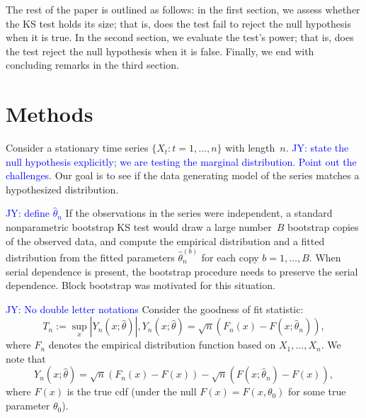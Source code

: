 \documentclass[12pt, letterpaper]{article}
\newcommand{\jy}[1]{\textcolor{blue}{JY: #1}}
\begin{document}
The rest of the paper is outlined as follows: in the first 
section, we assess whether the KS
test holds its size; that is, does the test fail to reject the null hypothesis
when it is true. In the second section, we evaluate the 
test's power; that is, does the test reject the null hypothesis when it is 
false.
Finally, we end with 
concluding remarks in the third section.

\section{Methods}
\label{sec:methods}

Consider a stationary time series $\{X_t: t = 1, \ldots, n\}$ with length~$n$.
\jy{state the null hypothesis explicitly; we are testing the marginal
  distribution. Point out the challenges.}
Our goal is to see if the data generating model of the series matches a 
hypothesized distribution.


\jy{define $\hat\theta_n$}
If the observations in the series were independent, a 
standard
nonparametric bootstrap KS test would draw a large number~$B$ bootstrap copies 
of the observed data, and compute the empirical distribution and a
fitted distribution from the fitted parameters
$\hat\theta_n^{(b)}$ for each copy $b = 1, \ldots, B$. When serial 
dependence is present, the bootstrap procedure 
needs to preserve the serial dependence. Block bootstrap was motivated for this 
situation.


\jy{No double letter notations}
Consider the goodness of fit statistic:
\begin{equation*}
  T_n := \sup_x|Y_n(x; \hat\theta)|, 
Y_n(x; \hat\theta) = \sqrt{n}(F_n(x) - F(x; \hat\theta_n)),
\end{equation*}
where $F_n$ denotes the empirical distribution function based on $X_1,...,X_n$.
We note that
\begin{equation*}
Y_n(x; \hat\theta) = \sqrt{n}(F_n(x) - F(x)) - 
\sqrt{n}(F(x; \hat\theta_n) - F(x)),
\end{equation*}
where $F(x)$ is the true cdf (under the null $F(x) = F(x, \theta_0)$ for some
true parameter $\theta_0$).
\end{document}
